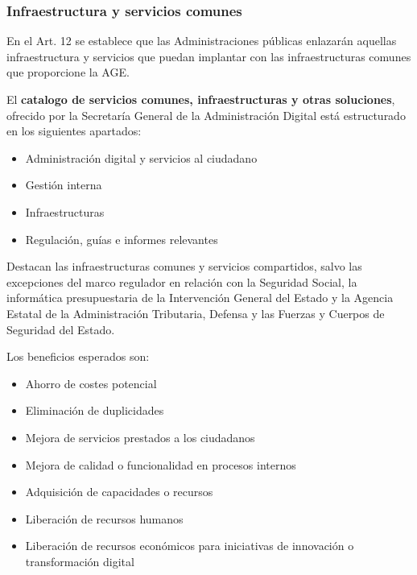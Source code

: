     \subsubsection{Infraestructura y servicios comunes} %
        En el Art. 12 se establece que las Administraciones públicas enlazarán aquellas infraestructura y servicios que puedan implantar con las infraestructuras comunes que proporcione la AGE.

        El \textbf{catalogo de servicios comunes, infraestructuras y otras soluciones}, ofrecido por la Secretaría General de la Administración Digital está estructurado en los siguientes apartados:
        \begin{itemize}
            \item Administración digital y servicios al ciudadano
            \item Gestión interna
            \item Infraestructuras
            \item Regulación, guías e informes relevantes
        \end{itemize}

        Destacan las infraestructuras comunes y servicios compartidos, salvo las excepciones del marco regulador en relación con la Seguridad Social, la informática presupuestaria de la Intervención General del Estado y la Agencia Estatal de la Administración Tributaria, Defensa y las Fuerzas y Cuerpos de Seguridad del Estado.

        Los beneficios esperados son:
        \begin{itemize}
            \item Ahorro de costes potencial
            \item Eliminación de duplicidades
            \item Mejora de servicios prestados a los ciudadanos
            \item Mejora de calidad o funcionalidad en procesos internos
            \item Adquisición de capacidades o recursos
            \item Liberación de recursos humanos
            \item Liberación de recursos económicos para iniciativas de innovación o transformación digital
        \end{itemize}

